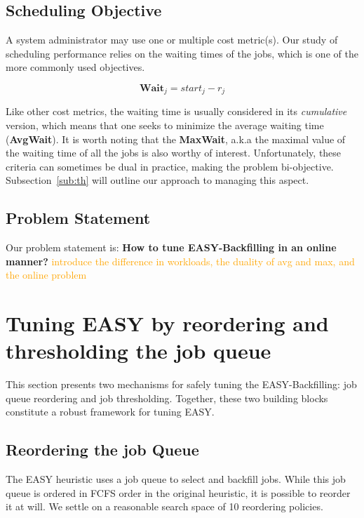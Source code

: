 \documentclass[sigconf]{acmart}
\begin{document}
\subsection{Scheduling Objective}
\label{sub:scheduling_objectives}

A system administrator may use one or multiple cost metric(s). Our study of
scheduling performance relies on the waiting times of the jobs, which is one of
the more commonly used objectives.

    \begin{equation}
      \textbf{Wait}_j =  start_j-r_j
    \end{equation}

Like other cost metrics, the waiting time is usually considered in its
\textit{cumulative} version, which means that one seeks to minimize the average
waiting time (\textbf{AvgWait}). It is worth noting that the \textbf{MaxWait},
a.k.a the maximal value of the waiting time of all the jobs is also worthy of
interest. Unfortunately, these criteria can sometimes be dual in practice,
making the problem bi-objective. Subsection~\ref{sub:th} will outline our
approach to managing this aspect.

\subsection{Problem Statement}

Our problem statement is: \textbf{How to tune EASY-Backfilling in an online manner?}
\textcolor{orange}{introduce the difference in workloads, the duality of avg and max, and the online problem}

\section{Tuning EASY by reordering and thresholding the job queue}
\label{sec:framework}

This section presents two mechanisms for safely tuning the EASY-Backfilling:
job queue reordering and job thresholding. Together, these two building blocks
constitute a robust framework for tuning EASY.

\subsection{Reordering the job Queue}
\label{subsec:policies}

The EASY heuristic uses a job queue to select and backfill jobs. While this job
queue is ordered in FCFS order in the original heuristic, it is possible to
reorder it at will. We settle on a reasonable search space of 10 reordering policies.
\end{document}
